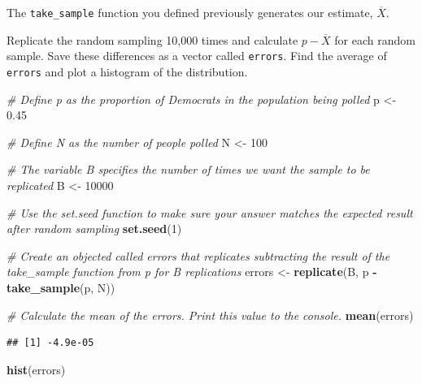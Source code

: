 \documentclass[
]{article}
\newenvironment{Shaded}{\begin{snugshade}}{\end{snugshade}}
\newcommand{\CommentTok}[1]{\textcolor[rgb]{0.56,0.35,0.01}{\textit{#1}}}
\newcommand{\DecValTok}[1]{\textcolor[rgb]{0.00,0.00,0.81}{#1}}
\newcommand{\FloatTok}[1]{\textcolor[rgb]{0.00,0.00,0.81}{#1}}
\newcommand{\KeywordTok}[1]{\textcolor[rgb]{0.13,0.29,0.53}{\textbf{#1}}}
\newcommand{\NormalTok}[1]{#1}
\newcommand{\OperatorTok}[1]{\textcolor[rgb]{0.81,0.36,0.00}{\textbf{#1}}}
\newcommand{\StringTok}[1]{\textcolor[rgb]{0.31,0.60,0.02}{#1}}
\begin{document}
The \texttt{take\_sample} function you defined previously generates our
estimate, \(\overline{X}\).

Replicate the random sampling 10,000 times and calculate
\(p − \overline{X}\) for each random sample. Save these differences as a
vector called \texttt{errors}. Find the average of \texttt{errors} and
plot a histogram of the distribution.

\begin{Shaded}
\begin{Highlighting}[]
\CommentTok{\# Define \textasciigrave{}p\textasciigrave{} as the proportion of Democrats in the population being polled}
\NormalTok{p \textless{}{-}}\StringTok{ }\FloatTok{0.45}

\CommentTok{\# Define \textasciigrave{}N\textasciigrave{} as the number of people polled}
\NormalTok{N \textless{}{-}}\StringTok{ }\DecValTok{100}

\CommentTok{\# The variable \textasciigrave{}B\textasciigrave{} specifies the number of times we want the sample to be replicated}
\NormalTok{B \textless{}{-}}\StringTok{ }\DecValTok{10000}

\CommentTok{\# Use the \textasciigrave{}set.seed\textasciigrave{} function to make sure your answer matches the expected result after random sampling}
\KeywordTok{set.seed}\NormalTok{(}\DecValTok{1}\NormalTok{)}

\CommentTok{\# Create an objected called \textasciigrave{}errors\textasciigrave{} that replicates subtracting the result of the \textasciigrave{}take\_sample\textasciigrave{} function from \textasciigrave{}p\textasciigrave{} for \textasciigrave{}B\textasciigrave{} replications}
\NormalTok{errors \textless{}{-}}\StringTok{ }\KeywordTok{replicate}\NormalTok{(B, p }\OperatorTok{{-}}\StringTok{ }\KeywordTok{take\_sample}\NormalTok{(p, N))}

\CommentTok{\# Calculate the mean of the errors. Print this value to the console.}
\KeywordTok{mean}\NormalTok{(errors)}
\end{Highlighting}
\end{Shaded}

\begin{verbatim}
## [1] -4.9e-05
\end{verbatim}

\begin{Shaded}
\begin{Highlighting}[]
\KeywordTok{hist}\NormalTok{(errors)}
\end{Highlighting}
\end{Shaded}
\end{document}
